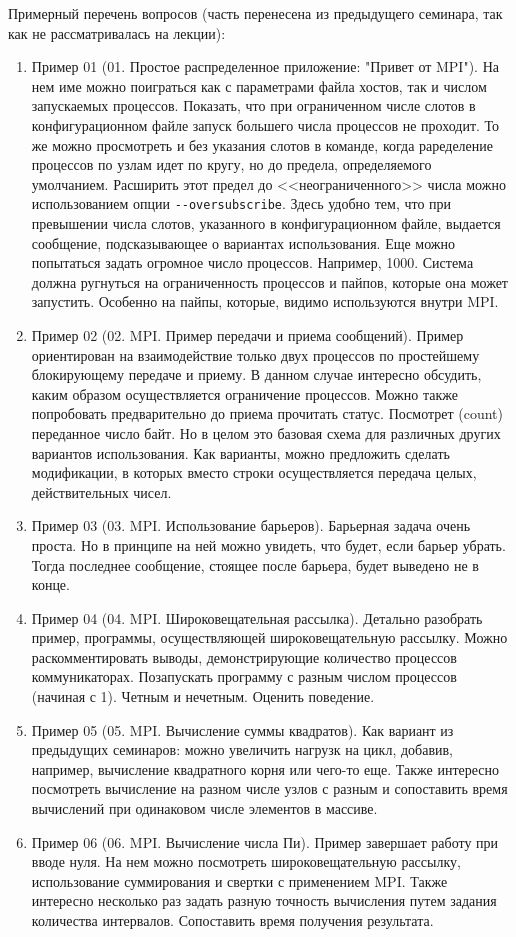Примерный перечень вопросов (часть перенесена из предыдущего семинара, так как не рассматривалась на лекции):
\begin{enumerate}
    \item Пример 01 (01. Простое распределенное приложение: "Привет от MPI"). На нем име можно поиграться как с параметрами файла хостов, так и числом запускаемых процессов. Показать, что при ограниченном числе слотов в конфигурационном файле запуск большего числа процессов не проходит. То же можно просмотреть и без указания слотов в команде, когда раределение процессов по узлам идет по кругу, но до предела, определяемого умолчанием. Расширить этот предел до <<неограниченного>> числа можно использованием опции \verb|--oversubscribe|. Здесь удобно тем, что при превышении числа слотов, указанного в конфигурационном файле, выдается сообщение, подсказывающее о вариантах использования. Еще можно попытаться задать огромное число процессов. Например, 1000. Система должна ругнуться на ограниченность процессов и пайпов, которые она может запустить. Особенно на пайпы, которые, видимо используются внутри MPI.
    \item Пример 02 (02. MPI. Пример передачи и приема сообщений). Пример ориентирован на взаимодействие только двух процессов по простейшему блокирующему передаче и приему. В данном случае интересно обсудить, каким образом осуществляется ограничение процессов. Можно также попробовать предварительно до приема прочитать статус. Посмотрет (count) переданное число байт. Но в целом это базовая схема для различных других вариантов использования. Как варианты, можно предложить сделать модификации, в которых вместо строки осуществляется передача целых, действительных чисел.
    \item Пример 03 (03. MPI. Использование барьеров). Барьерная задача очень проста. Но в принципе на ней можно увидеть, что будет, если барьер убрать. Тогда последнее сообщение, стоящее после барьера, будет выведено не в конце.
    \item Пример 04 (04. MPI. Широковещательная рассылка). Детально разобрать пример, программы, осуществляющей широковещательную рассылку. Можно раскомментировать выводы, демонстрирующие количество процессов коммуникаторах. Позапускать программу с разным числом процессов (начиная с 1). Четным и нечетным. Оценить поведение.
    \item Пример 05 (05. MPI. Вычисление суммы квадратов). Как вариант из предыдущих семинаров: можно увеличить нагрузк на цикл, добавив, например, вычисление квадратного корня или чего-то еще. Также интересно посмотреть вычисление на разном числе узлов с разным и сопоставить время вычислений при одинаковом числе элементов в массиве.
    \item Пример 06 (06. MPI. Вычисление числа Пи). Пример завершает работу при вводе нуля. На нем можно посмотреть широковещательную рассылку, использование суммирования и свертки с применением MPI. Также интересно несколько раз задать разную точность вычисления путем задания количества интервалов. Сопоставить время получения результата.
\end{enumerate}

